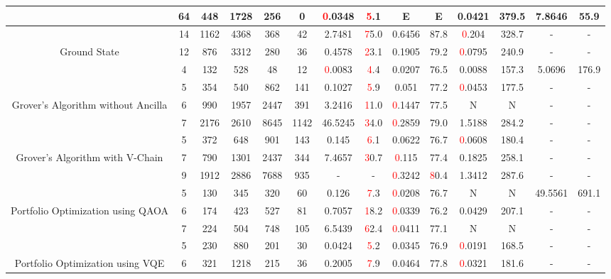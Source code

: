 \begin{table}[htb]
{\begin{tabular}{|c|c|c|c|c|c|c|c|c|c|c|c|c|c|}
 & 
64 & 448 & 1728 & 256 & 0
 & \textcolor{red}0.0348 & \textcolor{red}5.1
 & E & E
 & 0.0421 & 379.5
 & 7.8646 & 55.9
 \\
\hline
 & 
14 & 1162 & 4368 & 368 & 42
 & 2.7481 & \textcolor{red}75.0
 & 0.6456 & 87.8
 & \textcolor{red}0.204 & 328.7
 & - & -
 \\
Ground State & 
12 & 876 & 3312 & 280 & 36
 & 0.4578 & \textcolor{red}23.1
 & 0.1905 & 79.2
 & \textcolor{red}0.0795 & 240.9
 & - & -
 \\
 & 
4 & 132 & 528 & 48 & 12
 & \textcolor{red}0.0083 & \textcolor{red}4.4
 & 0.0207 & 76.5
 & 0.0088 & 157.3
 & 5.0696 & 176.9
 \\
\hline
 & 
5 & 354 & 540 & 862 & 141
 & 0.1027 & \textcolor{red}5.9
 & 0.051 & 77.2
 & \textcolor{red}0.0453 & 177.5
 & - & -
 \\
Grover's Algorithm without Ancilla & 
6 & 990 & 1957 & 2447 & 391
 & 3.2416 & \textcolor{red}11.0
 & \textcolor{red}0.1447 & 77.5
 & N & N 
 & - & -
 \\
 & 
7 & 2176 & 2610 & 8645 & 1142
 & 46.5245 & \textcolor{red}34.0
 & \textcolor{red}0.2859 & 79.0
 & 1.5188 & 284.2
 & - & -
 \\
\hline
 & 
5 & 372 & 648 & 901 & 143
 & 0.145 & \textcolor{red}6.1
 & 0.0622 & 76.7
 & \textcolor{red}0.0608 & 180.4
 & - & -
 \\
Grover's Algorithm with V-Chain & 
7 & 790 & 1301 & 2437 & 344
 & 7.4657 & \textcolor{red}30.7
 & \textcolor{red}0.115 & 77.4
 & 0.1825 & 258.1
 & - & -
 \\
 & 
9 & 1912 & 2886 & 7688 & 935
 & - & -
 & \textcolor{red}0.3242 & \textcolor{red}80.4
 & 1.3412 & 287.6
 & - & -
 \\
\hline
 & 
5 & 130 & 345 & 320 & 60
 & 0.126 & \textcolor{red}7.3
 & \textcolor{red}0.0208 & 76.7
 & N & N 
 & 49.5561 & 691.1
 \\
Portfolio Optimization using QAOA & 
6 & 174 & 423 & 527 & 81
 & 0.7057 & \textcolor{red}18.2
 & \textcolor{red}0.0339 & 76.2
 & 0.0429 & 207.1
 & - & -
 \\
 & 
7 & 224 & 504 & 748 & 105
 & 6.5439 & \textcolor{red}62.4
 & \textcolor{red}0.0411 & 77.1
 & N & N 
 & - & -
 \\
\hline
 & 
5 & 230 & 880 & 201 & 30
 & 0.0424 & \textcolor{red}5.2
 & 0.0345 & 76.9
 & \textcolor{red}0.0191 & 168.5
 & - & -
 \\
Portfolio Optimization using VQE & 
6 & 321 & 1218 & 215 & 36
 & 0.2005 & \textcolor{red}7.9
 & 0.0464 & 77.8
 & \textcolor{red}0.0321 & 181.6
 & - & -
 \\

\end{tabular}}
\end{table}
